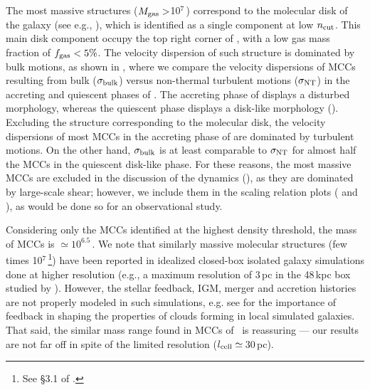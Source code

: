 \IfFileExists{emulateapjlegacy.cls}{\documentclass[iop]{emulateapjlegacy}}{\documentclass[iop]{emulateapj}}
\begin{document}
The most massive structures ($M_{\rm gas}>$10$^7$\,\Msun) correspond to the molecular disk of the galaxy (see e.g., ), which is identified as a single component at low $n_{\rm cut}$. This main disk component occupy the top right corner of , with a low gas mass fraction of $f_{\rm gas}< 5\%$. The velocity dispersion of such structure is dominated by bulk motions, as shown in , where we compare the velocity dispersions of MCCs resulting from bulk ($\sigma_{\rm bulk}$) versus non-thermal turbulent motions ($\sigma_{\rm NT}$) in the accreting and quiescent phases of \flower. The accreting phase of \flower displays a disturbed morphology, whereas the quiescent phase displays a disk-like morphology ().
%
Excluding the structure corresponding to the molecular disk, the velocity dispersions of most MCCs in the accreting phase of \flower are dominated by turbulent motions. On the other hand, $\sigma_{\rm bulk}$ is at least comparable to $\sigma_{\rm NT}$ for almost half the MCCs in the quiescent disk-like phase.
%
For these reasons, the most massive MCCs are excluded in the discussion of the dynamics (), as they are dominated by large-scale shear; however, we include them in the scaling relation plots ( and ), as would be done so for an observational study.

Considering only the MCCs identified at the highest density threshold, the mass of MCCs is $\simeq10^{6.5}$\,\Msun. We note that similarly massive molecular structures (few times 10$^7$\,\Msun\footnote{See \S{3.1} of \citet{Behrendt16a}.}) have been reported in idealized closed-box isolated galaxy simulations done at higher resolution (e.g., a maximum resolution of 3\,pc in the 48\,kpc box studied by \citealt{Behrendt16a}). However, the stellar feedback, IGM, merger and accretion histories are not properly modeled in such simulations, e.g. see \citet{grisdale:2017,grisdale:2019} for the importance of feedback in shaping the properties of clouds forming in local simulated galaxies. That said, the similar mass range found in MCCs of \flower\ is reassuring --- our results are not far off in spite of the limited resolution ($l_{\rm cell}\simeq$\,30\,pc).
\end{document}
